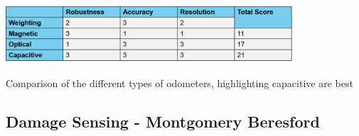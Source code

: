 \documentclass[11pt]{article}		%
\newcommand{\supercite}[1]{\textsuperscript{\cite{#1}}}		%
\newcommand{\tableref}[1]{\hyperref[#1]{Table \ref*{#1}}}     %
\begin{document}
	        \begin{table}[h]
    			\centering
    			\includegraphics[width=0.8\textwidth]{Encoder comparison table}
    			\caption{Comparison of the different types of odometers, highlighting capacitive are best}
    			\label{odometer_comparison}
			\end{table}			
	        
	        \subsection[Damage Sensing]{Damage Sensing - Montgomery Beresford}
	        
\end{document}
